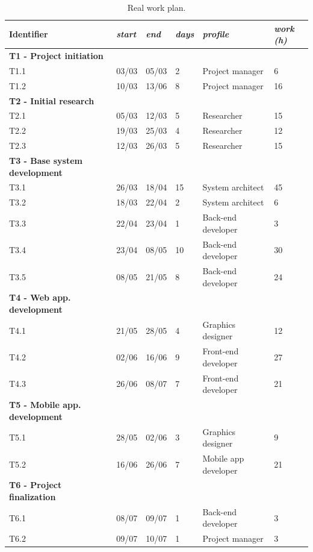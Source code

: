 \begin{table}[ht]
  \centering
  \caption{Real work plan.}\label{tab:project-plan}
  \begin{tabular}{llllll}
    \toprule
      \textbf{Identifier} & \emph{start} & \emph{end} & \emph{days} & \emph{profile} & \emph{work (h)}\\
    \midrule
      \textbf{T1 - Project initiation}\\
    \midrule
	  T1.1 & 03/03 & 05/03 & 2 & Project manager & 6\\
      T1.2 & 10/03 & 13/06 & 8 & Project manager & 16\\
    \midrule
      \textbf{T2 - Initial research}\\
    \midrule
      T2.1 & 05/03 & 12/03 & 5 & Researcher & 15\\
      T2.2 & 19/03 & 25/03 & 4 & Researcher & 12\\
      T2.3 & 12/03 & 26/03 & 5 & Researcher & 15\\
    \midrule 
      \textbf{T3 - Base system development}\\
    \midrule
      T3.1 & 26/03 & 18/04 & 15 & System architect & 45\\
      T3.2 & 18/03 & 22/04 & 2 & System architect & 6\\
      T3.3 & 22/04 & 23/04 & 1 & Back-end developer & 3\\
      T3.4 & 23/04 & 08/05 & 10& Back-end developer & 30\\
      T3.5 & 08/05 & 21/05 & 8 & Back-end developer & 24\\
    \midrule
      \textbf{T4 - Web app. development}\\
    \midrule
      T4.1 & 21/05 & 28/05 & 4 & Graphics designer & 12\\
      T4.2 & 02/06 & 16/06 & 9 & Front-end developer & 27\\
      T4.3 & 26/06 & 08/07 & 7 & Front-end developer & 21\\
    \midrule
      \textbf{T5 - Mobile app. development}\\
    \midrule
      T5.1 & 28/05 & 02/06 & 3 & Graphics designer & 9\\
      T5.2 & 16/06 & 26/06 & 7 & Mobile app developer & 21\\
    \midrule
      \textbf{T6 - Project finalization}\\
    \midrule
      T6.1 & 08/07 & 09/07 & 1 & Back-end developer & 3\\
      T6.2 & 09/07 & 10/07 & 1 & Project manager & 3\\
  \end{tabular}
\end{table}

